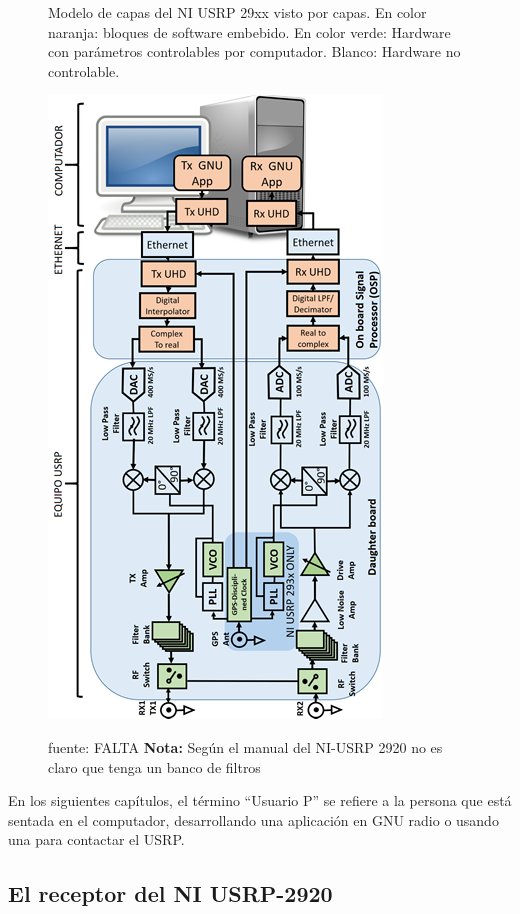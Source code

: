 \vspace{400px}
\begin{figure}[h!]
	\captionsetup{justification = raggedright, singlelinecheck = false}
	\caption{Modelo de capas del NI USRP 29xx visto por capas. En color naranja: bloques de software embebido. En color verde: Hardware con parámetros controlables por computador. Blanco: Hardware no controlable.} 
	\centering
	\includegraphics[scale=0.8]{Imagenes/Modelo-29xx.png}
	\label{fig:Modelo-29xx}
			\caption*{fuente: FALTA \textbf{Nota:} Según el manual del NI-USRP 2920 no es claro que tenga un banco de filtros}
\end{figure}

En los siguientes capítulos, el término “Usuario P” se refiere a la persona que está sentada en el computador, desarrollando una aplicación en GNU radio o usando una para contactar el USRP. \\

\subsection{El receptor del NI USRP-2920}

